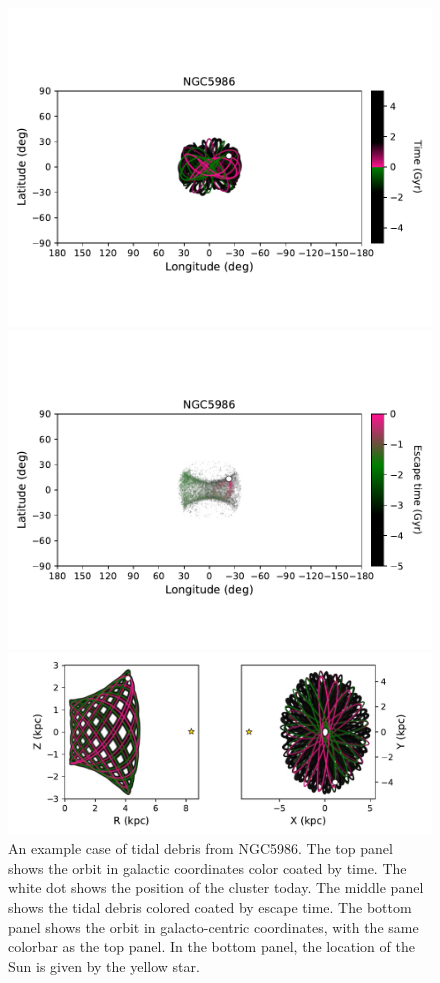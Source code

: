 \begin{figure}
    \centering
    \includegraphics[width=0.9\linewidth,trim={0 3cm 0 2cm},clip]{images/NGC5986orbit.pdf}

    \includegraphics[width=0.9\linewidth,trim={0 2cm 0 3cm},clip]{images/NGC5986_LB_tesc.pdf}

    \includegraphics[width=0.9\linewidth]{images/NGC5986orbitRZXY.pdf}    
    \caption{An example case of tidal debris from NGC5986. The top panel shows the orbit in galactic coordinates color coated by time. The white dot shows the position of the cluster today. The middle panel shows the tidal debris colored coated by escape time. The bottom panel shows the orbit in galacto-centric coordinates, with the same colorbar as the top panel. In the bottom panel, the location of the Sun is given by the yellow star.   }
    \label{fig:NGC5986}
\end{figure}

